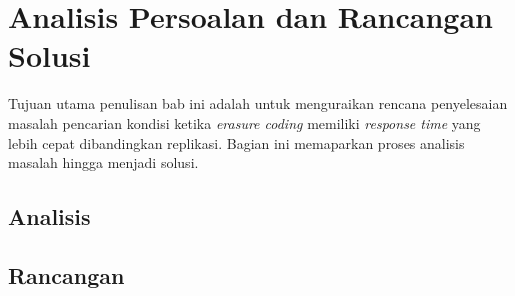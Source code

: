 \chapter{Analisis Persoalan dan Rancangan Solusi}

Tujuan utama penulisan bab ini adalah untuk menguraikan rencana penyelesaian masalah pencarian kondisi ketika \textit{erasure coding} memiliki \textit{response time} yang lebih cepat dibandingkan replikasi. Bagian ini memaparkan proses analisis masalah hingga menjadi solusi.


\section{Analisis}







\section{Rancangan}



